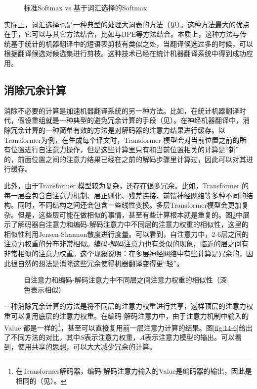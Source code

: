 \begin{figure}[htp]
\centering

\caption{标准Softmax vs 基于词汇选择的Softmax}
\label{fig:14-4}
\end{figure}
\parinterval 实际上，词汇选择也是一种典型的处理大词表的方法（见\chapterthirteen）。这种方法最大的优点在于，它可以与其它方法结合，比如与BPE等方法结合。本质上，这种方法与传统基于统计的机器翻译中的短语表剪枝有类似之处，当翻译候选过多的时候，可以根据翻译候选对候选集进行剪枝。这种技术已经在统计机器翻译系统中得到成功应用。



\subsection{消除冗余计算}

\parinterval 消除不必要的计算是加速机器翻译系统的另一种方法。比如，在统计机器翻译时代，假设重组就是一种典型的避免冗余计算的手段（见{\chapterseven}）。在神经机器翻译中，消除冗余计算的一种简单有效的方法是对解码器的注意力结果进行缓存。以Transformer为例，在生成每个译文时，Transformer 模型会对当前位置之前的所有位置进行自注意力操作，但是这些计算里只有和当前位置相关的计算是“新” 的，前面位置之间的注意力结果已经在之前的解码步骤里计算过，因此可以对其进行缓存。

\parinterval 此外，由于Transformer 模型较为复杂，还存在很多冗余。比如，Transformer 的每一层会包含自注意力机制、层正则化、残差连接、前馈神经网络等多种不同的结构。同时，不同结构之间还会包含一些线性变换。多层Transformer模型会更加复杂。但是，这些层可能在做相似的事情，甚至有些计算根本就是重复的。图\ref{fig:14-5}中展示了解码器自注意力和编码-解码注意力中不同层的注意力权重的相似性，这里的相似性利用Jensen-Shannon散度进行度量。可以看到，自注意力中，2-6层之间的注意力权重的分布非常相似。编码-解码注意力也有类似的现象，临近的层之间有非常相似的注意力权重。这个现象说明：在多层神经网络中有些计算是冗余的，因此很自然的想法是消除这些冗余使得机器翻译变得更“轻”。

\begin{figure}[htp]
\centering

\caption{自注意力和编码-解码注意力中不同层之间注意力权重的相似性（深色表示相似）}
\label{fig:14-5}
\end{figure}
\parinterval 一种消除冗余计算的方法是将不同层的注意力权重进行共享，这样顶层的注意力权重可以复用底层的注意力权重。在编码-解码注意力中，由于注意力机制中输入的Value 都是一样的\footnote{在Transformer解码器，编码-解码注意力输入的Value是编码器的输出，因此是相同的（见\chaptertwelve）。}，甚至可以直接复用前一层注意力计算的结果。图\ref{fig:14-6}给出了不同方法的对比，其中$S$表示注意力权重，$A$表示注意力模型的输出。可以看到，使用共享的思想，可以大大减少冗余的计算。

